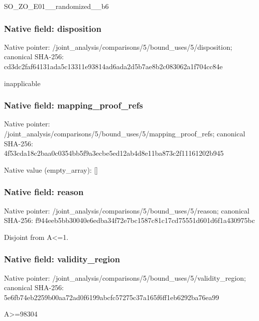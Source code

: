 \documentclass[10pt,a4paper]{article}
\begin{document}
\begingroup\raggedright\sloppy SO\_\allowbreak{}ZO\_\allowbreak{}E01\_\allowbreak{}\_\allowbreak{}randomized\_\allowbreak{}\_\allowbreak{}b6\par\endgroup

\subsubsection{Native field: disposition}
Native pointer: /joint\_\allowbreak{}analysis/comparisons/5/bound\_\allowbreak{}uses/5/disposition; canonical SHA-256: cd3dc2faf64131ada5c13311e93814ad6ada2d5b7ae8b2c083062a1f704cc84e

\begingroup\raggedright\sloppy inapplicable\par\endgroup

\subsubsection{Native field: mapping\_\allowbreak{}proof\_\allowbreak{}refs}
Native pointer: /joint\_\allowbreak{}analysis/comparisons/5/bound\_\allowbreak{}uses/5/mapping\_\allowbreak{}proof\_\allowbreak{}refs; canonical SHA-256: 4f53cda18c2baa0c0354bb5f9a3ecbe5ed12ab4d8e11ba873c2f11161202b945

Native value (empty\_\allowbreak{}array): []

\subsubsection{Native field: reason}
Native pointer: /joint\_\allowbreak{}analysis/comparisons/5/bound\_\allowbreak{}uses/5/reason; canonical SHA-256: f944eeb5bb30040e6edba34f72e7bc1587c81c17cd75551d601d6f1a430975bc

\begingroup\raggedright\sloppy Disjoint from A<=\allowbreak{}1.\par\endgroup

\subsubsection{Native field: validity\_\allowbreak{}region}
Native pointer: /joint\_\allowbreak{}analysis/comparisons/5/bound\_\allowbreak{}uses/5/validity\_\allowbreak{}region; canonical SHA-256: 5e6fb74eb2259b00aa72ad0f6199abcfc57275c37a165f6ff1eb6292ba76ea99

\begingroup\raggedright\sloppy A>=\allowbreak{}98304\par\endgroup
\end{document}
